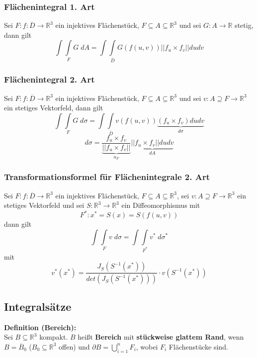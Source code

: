 \documentclass[a4paper,twocolumn,10pt]{article}
\begin{document}
\subsubsection{Flächenintegral 1. Art}
Sei $F:f:\overline{D}\rightarrow\mathbb{R}^3$ ein injektives Flächenstück, $F\subseteq A\subseteq\mathbb{R}^3$ und sei $G:A\rightarrow\mathbb{R}$ stetig, dann gilt
\begin{equation*}
\int\int\limits_{F}G\;dA=\int\int\limits_{\overline{D}}G(f(u,v))||f_u\times f_v||dudv
\end{equation*}

\subsubsection{Flächenintegral 2. Art}
Sei $F:f:\overline{D}\rightarrow\mathbb{R}^3$ ein injektives Flächenstück, $F\subseteq A\subseteq\mathbb{R}^3$ und sei $v:A\supseteq F\rightarrow\mathbb{R}^3$ ein stetiges Vektorfeld, dann gilt
\begin{equation*}
\int\int\limits_{F}G\;d\sigma=\int\int\limits_{\overline{D}}v(f(u,v))\underbrace{(f_u\times f_v)dudv}_{d\sigma}
\end{equation*}
\begin{equation*}
d\sigma =\underbrace{\frac{f_u\times f_v}{||f_u\times f_v||}}_{n_F}\underbrace{||f_u\times f_v||dudv}_{dA}
\end{equation*}

\subsubsection{Transformationsformel für Flächenintegrale 2. Art}
Sei $F:f:\overline{D}\rightarrow\mathbb{R}^3$ ein injektives Flächenstück, $F\subseteq A\subseteq\mathbb{R}^3$, sei $v:A\supseteq F\rightarrow\mathbb{R}^3$ ein stetiges Vektorfeld und sei $S:\mathbb{R}^3\rightarrow\mathbb{R}^3$ ein Diffeomorphismus mit
\begin{equation*}
F^*:x^*=S(x)=S(f(u,v))
\end{equation*}
dann gilt
\begin{equation*}
\int\int\limits_{F}v\;d\sigma =\int\int\limits_{F^*}v^*\;d\sigma^*
\end{equation*}
mit
\begin{equation*}
v^*(x^*)=\frac{J_S(S^{-1}(x^*))}{det(J_S(S^{-1}(x^*)))}\cdot v(S^{-1}(x^*))
\end{equation*}

\subsection{Integralsätze}
\textbf{Definition (Bereich):}\\
Sei $B\subseteq\mathbb{R}^3$ kompakt. $B$ heißt \textbf{Bereich} mit \textbf{stückweise glattem Rand}, wenn $B=\overline{B}_0$ ($B_0\subseteq\mathbb{R}^3$ offen) und $\partial B=\bigcup\limits_{i=1}^{n}F_i$, wobei $F_i$ Flächenstücke sind.
\end{document}
